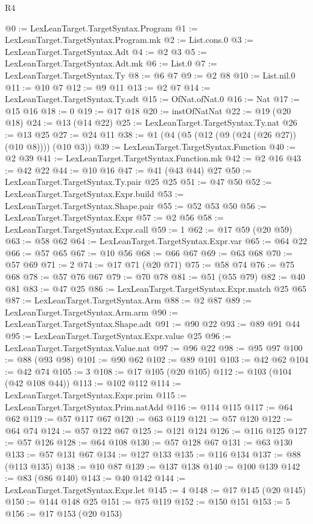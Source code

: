 \begin{lexlean}{R4}
\begin{coremodule}
@0 := LexLeanTarget.TargetSyntax.Program
@1 := LexLeanTarget.TargetSyntax.Program.mk
@2 := List.cons.{0}
@3 := LexLeanTarget.TargetSyntax.Adt
@4 := @2 @3
@5 := LexLeanTarget.TargetSyntax.Adt.mk
@6 := List.{0}
@7 := LexLeanTarget.TargetSyntax.Ty
@8 := @6 @7
@9 := @2 @8
@10 := List.nil.{0}
@11 := @10 @7
@12 := @9 @11
@13 := @2 @7
@14 := LexLeanTarget.TargetSyntax.Ty.adt
@15 := OfNat.ofNat.{0}
@16 := Nat
@17 := @15 @16
@18 := 0
@19 := @17 @18
@20 := instOfNatNat
@22 := @19 (@20 @18)
@24 := @13 (@14 @22)
@25 := LexLeanTarget.TargetSyntax.Ty.nat
@26 := @13 @25
@27 := @24 @11
@38 := @1 (@4 (@5 (@12 (@9 (@24 (@26 @27)) (@10 @8)))) (@10 @3))
@39 := LexLeanTarget.TargetSyntax.Function
@40 := @2 @39
@41 := LexLeanTarget.TargetSyntax.Function.mk
@42 := @2 @16
@43 := @42 @22
@44 := @10 @16
@47 := @41 (@43 @44) @27
@50 := LexLeanTarget.TargetSyntax.Ty.pair @25 @25
@51 := @47 @50
@52 := LexLeanTarget.TargetSyntax.Expr.build
@53 := LexLeanTarget.TargetSyntax.Shape.pair
@55 := @52 @53 @50
@56 := LexLeanTarget.TargetSyntax.Expr
@57 := @2 @56
@58 := LexLeanTarget.TargetSyntax.Expr.call
@59 := 1
@62 := @17 @59 (@20 @59)
@63 := @58 @62
@64 := LexLeanTarget.TargetSyntax.Expr.var
@65 := @64 @22
@66 := @57 @65
@67 := @10 @56
@68 := @66 @67
@69 := @63 @68
@70 := @57 @69
@71 := 2
@74 := @17 @71 (@20 @71)
@75 := @58 @74
@76 := @75 @68
@78 := @57 @76 @67
@79 := @70 @78
@81 := @51 (@55 @79)
@82 := @40 @81
@83 := @47 @25
@86 := LexLeanTarget.TargetSyntax.Expr.match @25 @65
@87 := LexLeanTarget.TargetSyntax.Arm
@88 := @2 @87
@89 := LexLeanTarget.TargetSyntax.Arm.arm
@90 := LexLeanTarget.TargetSyntax.Shape.adt
@91 := @90 @22
@93 := @89 @91 @44
@95 := LexLeanTarget.TargetSyntax.Expr.value @25
@96 := LexLeanTarget.TargetSyntax.Value.nat
@97 := @96 @22
@98 := @95 @97
@100 := @88 (@93 @98)
@101 := @90 @62
@102 := @89 @101
@103 := @42 @62
@104 := @42 @74
@105 := 3
@108 := @17 @105 (@20 @105)
@112 := @103 (@104 (@42 @108 @44))
@113 := @102 @112
@114 := LexLeanTarget.TargetSyntax.Expr.prim
@115 := LexLeanTarget.TargetSyntax.Prim.natAdd
@116 := @114 @115
@117 := @64 @62
@119 := @57 @117 @67
@120 := @63 @119
@121 := @57 @120
@122 := @64 @74
@124 := @57 @122 @67
@125 := @121 @124
@126 := @116 @125
@127 := @57 @126
@128 := @64 @108
@130 := @57 @128 @67
@131 := @63 @130
@133 := @57 @131 @67
@134 := @127 @133
@135 := @116 @134
@137 := @88 (@113 @135)
@138 := @10 @87
@139 := @137 @138
@140 := @100 @139
@142 := @83 (@86 @140)
@143 := @40 @142
@144 := LexLeanTarget.TargetSyntax.Expr.let
@145 := 4
@148 := @17 @145 (@20 @145)
@150 := @144 @148 @25
@151 := @75 @119
@152 := @150 @151
@153 := 5
@156 := @17 @153 (@20 @153)

\end{coremodule}
\end{lexlean}
